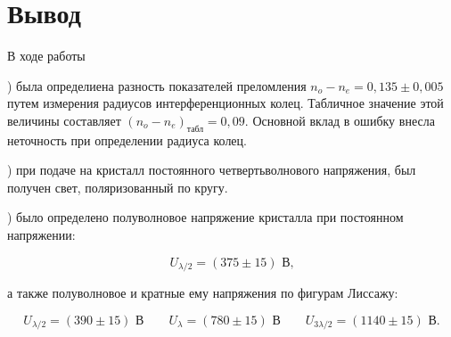 \documentclass[a4paper,12pt]{article} %
\begin{document}
\section{Вывод}

\medskip

\noindent В ходе работы

\medskip

) была определиена разность показателей преломления $n_o - n_e = 0,135 \pm 0,005$ путем измерения радиусов интерференционных колец. Табличное значение этой величины составляет $(n_o - n_e)_\text{табл} = 0,09$. Основной вклад в ошибку внесла неточность при определении радиуса колец.

\medskip

) при подаче на кристалл постоянного четвертьволнового напряжения, был получен свет, поляризованный по кругу. 

\medskip

) было определено полуволновое напряжение кристалла при постоянном напряжении:

$$U_{\lambda/2} = (375 \pm 15) \text{ В,}$$

\noindent а также полуволновое и кратные ему напряжения по фигурам Лиссажу: 

\[U_{\lambda/2} = (390 \pm 15) \text{ В} \qquad U_\lambda = (780 \pm 15) \text{ В} \qquad U_{3\lambda/2} = (1140 \pm 15) \text{ В.}\]
\end{document}
